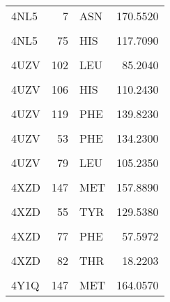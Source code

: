 \begin{table}
\begin{tabular}{lrlr}
			4NL5 & 7 & ASN & 170.5520\\
			\cellcolor{gray!6}{4NL5} & \cellcolor{gray!6}{71} & \cellcolor{gray!6}{ALA} & \cellcolor{gray!6}{99.7605}\\
			4NL5 & 75 & HIS & 117.7090\\
			\addlinespace
			\cellcolor{gray!6}{4NL5} & \cellcolor{gray!6}{9} & \cellcolor{gray!6}{ILE} & \cellcolor{gray!6}{125.9250}\\
			4UZV & 102 & LEU & 85.2040\\
			\cellcolor{gray!6}{4UZV} & \cellcolor{gray!6}{105} & \cellcolor{gray!6}{ARG} & \cellcolor{gray!6}{101.6930}\\
			4UZV & 106 & HIS & 110.2430\\
			\cellcolor{gray!6}{4UZV} & \cellcolor{gray!6}{111} & \cellcolor{gray!6}{ILE} & \cellcolor{gray!6}{140.3930}\\
			\addlinespace
			4UZV & 119 & PHE & 139.8230\\
			\cellcolor{gray!6}{4UZV} & \cellcolor{gray!6}{151} & \cellcolor{gray!6}{MET} & \cellcolor{gray!6}{159.1620}\\
			4UZV & 53 & PHE & 134.2300\\
			\cellcolor{gray!6}{4UZV} & \cellcolor{gray!6}{67} & \cellcolor{gray!6}{PHE} & \cellcolor{gray!6}{105.7360}\\
			4UZV & 79 & LEU & 105.2350\\
			\addlinespace
			\cellcolor{gray!6}{4XZD} & \cellcolor{gray!6}{144} & \cellcolor{gray!6}{ARG} & \cellcolor{gray!6}{98.1313}\\
			4XZD & 147 & MET & 157.8890\\
			\cellcolor{gray!6}{4XZD} & \cellcolor{gray!6}{40} & \cellcolor{gray!6}{ARG} & \cellcolor{gray!6}{118.8830}\\
			4XZD & 55 & TYR & 129.5380\\
			\cellcolor{gray!6}{4XZD} & \cellcolor{gray!6}{75} & \cellcolor{gray!6}{TYR} & \cellcolor{gray!6}{127.5350}\\
			\addlinespace
			4XZD & 77 & PHE & 57.5972\\
			\cellcolor{gray!6}{4XZD} & \cellcolor{gray!6}{81} & \cellcolor{gray!6}{HIS} & \cellcolor{gray!6}{114.4420}\\
			4XZD & 82 & THR & 18.2203\\
			\cellcolor{gray!6}{4Y1Q} & \cellcolor{gray!6}{144} & \cellcolor{gray!6}{ARG} & \cellcolor{gray!6}{98.5684}\\
			4Y1Q & 147 & MET & 164.0570\\

\end{tabular}
\end{table}
